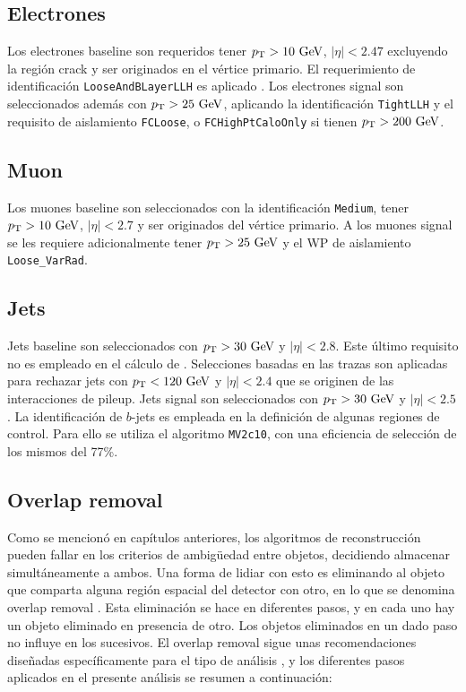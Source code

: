 \subsection{Electrones}

Los electrones baseline son requeridos tener $\pt>10\ \gev$, $|\eta|<2.47$ excluyendo la región crack y ser originados en el vértice primario. El requerimiento de identificación \texttt{LooseAndBLayerLLH} es aplicado . Los electrones signal son seleccionados además con $\pt>25\ \gev$, aplicando la identificación \texttt{TightLLH} y el requisito de aislamiento \texttt{FCLoose}, o \texttt{FCHighPtCaloOnly} si tienen $p_{\text{T}}>200\ \text{GeV}$.


\subsection{Muon}

Los muones baseline son seleccionados con la identificación \texttt{Medium}, tener $\pt>10\ \gev$, $|\eta|<2.7$ y ser originados del vértice primario. A los muones signal se les requiere adicionalmente tener $\pt>25\ \gev$ y el WP de aislamiento \texttt{Loose\_VarRad}.


\subsection{Jets}

Jets baseline son seleccionados con $p_{\text{T}}>30\ \text{GeV}$ y $|\eta|<2.8$. Este último requisito no es empleado en el cálculo de \met. Selecciones basadas en las trazas son aplicadas para rechazar jets con $p_{\text{T}}<120\ \text{GeV}$ y $|\eta|<2.4$ que se originen de las interacciones de pileup. Jets signal son seleccionados con $p_{\text{T}}>30\ \text{GeV}$ y $|\eta|<2.5$. La identificación de $b$-jets es empleada en la definición de algunas regiones de control. Para ello se utiliza el algoritmo \texttt{MV2c10}, con una eficiencia de selección de los mismos del 77\%.

\subsection{Overlap removal}

Como se mencionó en capítulos anteriores, los algoritmos de reconstrucción pueden fallar en los criterios de ambigüedad entre objetos, decidiendo almacenar simultáneamente a ambos. Una forma de lidiar con esto es eliminando al objeto que comparta alguna región espacial del detector con otro, en lo que se denomina overlap removal \cite{Adams:1743654}. Esta eliminación se hace en diferentes pasos, y en cada uno hay un objeto eliminado en presencia de otro. Los objetos eliminados en un dado paso no influye en los sucesivos.
El overlap removal sigue unas recomendaciones diseñadas específicamente para el tipo de análisis \cite{ATL-COM-PHYS-2016-1518}, y los diferentes pasos aplicados en el presente análisis se resumen a continuación: 

